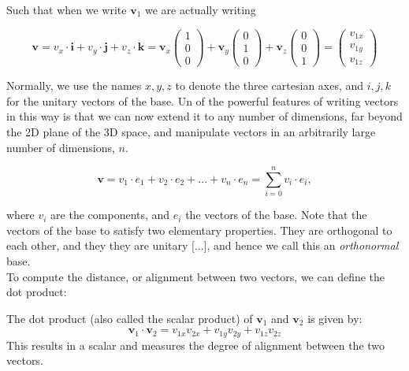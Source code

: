 \documentclass{book}
\begin{document}
Such that when we write $\mathbf{v}_1$ we are actually writing

\begin{equation}
	\mathbf{v} = v_x \cdot \mathbf{i} + v_y \cdot \mathbf{j} + v_z \cdot \mathbf{k} = 
	\mathbf{v}_x \begin{pmatrix} 1 \\ 0 \\ 0 \end{pmatrix} + 
	\mathbf{v}_y \begin{pmatrix} 0 \\ 1 \\ 0 \end{pmatrix} + 
	\mathbf{v}_z \begin{pmatrix} 0 \\ 0 \\ 1 \end{pmatrix} =
	\begin{pmatrix} v_{1x} \\ v_{1y} \\ v_{1z} \end{pmatrix}
\end{equation}

Normally, we use the names $x, y, z$ to denote the three cartesian axes, and $i, j, k$ for the unitary vectors of the base. Un of the powerful features of writing vectors in this way is that we can now extend it to any number of dimensions, far beyond the 2D plane of the 3D space, and manipulate vectors in an arbitrarily large number of dimensions, $n$.

\begin{equation}
	\mathbf{v} = v_1 \cdot e_1 + v_2 \cdot e_2 + ... + v_n \cdot e_n = \sum_{i = 0}^{n} v_i \cdot e_i, 
\end{equation}

where $v_i$ are the components, and $e_i$ the vectors of the base. Note that the vectors of the base to satisfy two elementary properties. They are orthogonal to each other, and they they are unitary [...], and hence we call this an \textit{orthonormal} base.\\

To compute the distance, or alignment between two vectors, we can define the dot product:

The dot product (also called the scalar product) of \( \mathbf{v}_1 \) and \( \mathbf{v}_2 \) is given by:
\begin{equation}
	\mathbf{v}_1 \cdot \mathbf{v}_2 = v_{1x}v_{2x} + v_{1y}v_{2y} + v_{1z}v_{2z}
\end{equation}
This results in a scalar and measures the degree of alignment between the two vectors.\\
\end{document}
